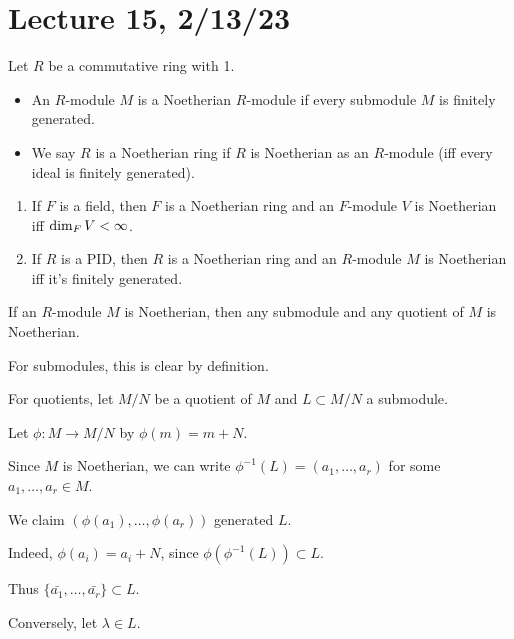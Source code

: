\documentclass[x11names,reqno,14pt]{extarticle}
\begin{document}
\section*{Lecture 15, 2/13/23}


Let $R$ be a commutative ring with 1. 

\begin{itemize}

\item An $R$-module $M$ is a Noetherian $R$-module if every submodule $M$ is finitely generated. 

\item We say $R$ is a Noetherian ring if $R$ is Noetherian as an $R$-module (iff every ideal is finitely generated). 

\end{itemize}

\exm

\begin{enumerate}

\item If $F$ is a field, then $F$ is a Noetherian ring and an $F$-module $V$ is Noetherian iff $\dim_FV < \infty$. 

\item If $R$ is a PID, then $R$ is a Noetherian ring and an $R$-module $M$ is Noetherian iff it's finitely generated. 

\end{enumerate}

\prop

If an $R$-module $M$ is Noetherian, then any submodule and any quotient of $M$ is Noetherian. 

\proof

For submodules, this is clear by definition. 

For quotients, let $M/N$ be a quotient of $M$ and $L\subset M/N$ a submodule. 

Let $\phi:M\to M/N$ by $\phi(m) = m + N$. 

Since $M$ is Noetherian, we can write $\phi^{-1}(L) = (a_1, \dots, a_r)$ for some $a_1, \dots, a_r \in M$. 

We claim $(\phi(a_1), \dots, \phi(a_r))$ generated $L$. 

Indeed, $\phi(a_i) = a_i + N$, since $\phi(\phi^{-1}(L)) \subset L$. 

Thus $\{\bar{a_1},\dots,\bar{a_r}\}\subset L$. 

Conversely, let $\lambda \in L$. 
\end{document}
